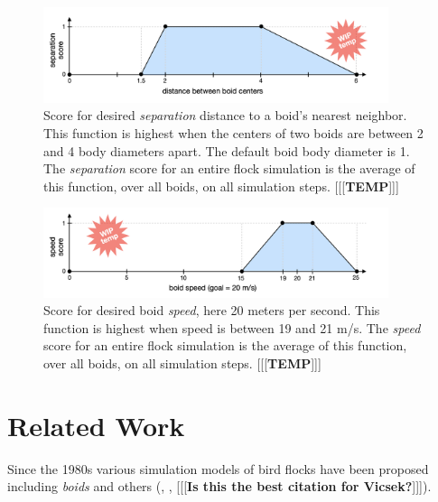 \documentclass[letterpaper]{article}
\begin{document}
\begin{figure}[t]
    \centering
    \includegraphics[width=0.9\textwidth]{images/temp_sep_score.png}
    \caption{Score for desired \textit{separation} distance to a boid's nearest neighbor. This function is highest when the centers of two boids are between 2 and 4 body diameters apart. The default boid body diameter is 1. The \textit{separation} score for an entire flock simulation is the average of this function, over all boids, on all simulation steps. [[[\textbf{TEMP}]]]}
    \label{fig:separation_score}
\end{figure}

\begin{figure}[t]
    \centering
    \includegraphics[width=0.9\textwidth]{images/temp_speed_score.png}
    \caption{Score for desired boid \textit{speed}, here 20 meters per second. This function is highest when speed is between 19 and 21 m/s. The \textit{speed} score for an entire flock simulation is the average of this function, over all boids, on all simulation steps. [[[\textbf{TEMP}]]]}
    \label{fig:speed_score}
\end{figure}


\section{Related Work}
\label{sec:related}

Since the 1980s various simulation models of bird flocks have been proposed including \textit{boids} \citep{reynolds_flocks_1987} and others (\citet{aoki_simulation_1982}, \citet{cucker_emergent_2007}, \citet{bhattacharya_collective_2010} [[[\textbf{Is this the best citation for Vicsek?}]]]).
\end{document}
